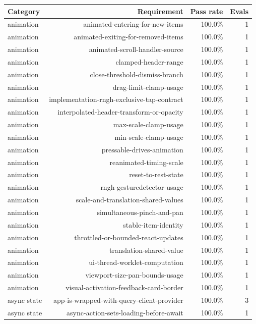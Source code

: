 \begin{table}[htbp]
\centering
\begin{tabular}{lrrr}
\toprule
Category & Requirement & Pass rate & Evals \\
\midrule
animation & animated-entering-for-new-items & 100.0\% & 1 \\
animation & animated-exiting-for-removed-items & 100.0\% & 1 \\
animation & animated-scroll-handler-source & 100.0\% & 1 \\
animation & clamped-header-range & 100.0\% & 1 \\
animation & close-threshold-dismiss-branch & 100.0\% & 1 \\
animation & drag-limit-clamp-usage & 100.0\% & 1 \\
animation & implementation-rngh-exclusive-tap-contract & 100.0\% & 1 \\
animation & interpolated-header-transform-or-opacity & 100.0\% & 1 \\
animation & max-scale-clamp-usage & 100.0\% & 1 \\
animation & min-scale-clamp-usage & 100.0\% & 1 \\
animation & pressable-drives-animation & 100.0\% & 1 \\
animation & reanimated-timing-scale & 100.0\% & 1 \\
animation & reset-to-rest-state & 100.0\% & 1 \\
animation & rngh-gesturedetector-usage & 100.0\% & 1 \\
animation & scale-and-translation-shared-values & 100.0\% & 1 \\
animation & simultaneous-pinch-and-pan & 100.0\% & 1 \\
animation & stable-item-identity & 100.0\% & 1 \\
animation & throttled-or-bounded-react-updates & 100.0\% & 1 \\
animation & translation-shared-value & 100.0\% & 1 \\
animation & ui-thread-worklet-computation & 100.0\% & 1 \\
animation & viewport-size-pan-bounds-usage & 100.0\% & 1 \\
animation & visual-activation-feedback-card-border & 100.0\% & 1 \\
async state & app-is-wrapped-with-query-client-provider & 100.0\% & 3 \\
async state & async-action-sets-loading-before-await & 100.0\% & 1 \\

\end{tabular}
\end{table}

